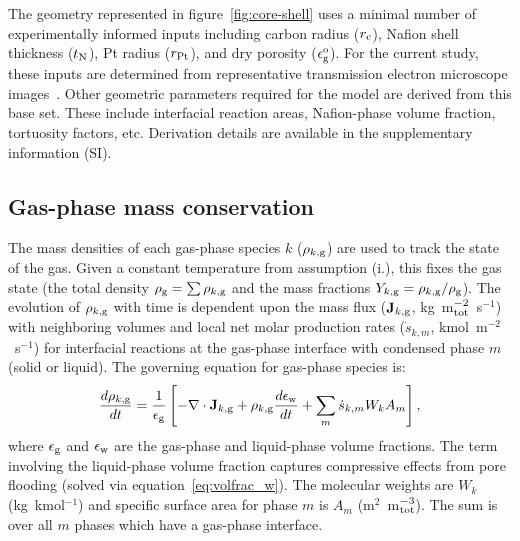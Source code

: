 \documentclass[final,3p,times,twocolumn]{elsarticle}    %
\begin{document}
The geometry represented in figure~\ref{fig:core-shell} uses a minimal number of experimentally informed inputs including carbon radius ($r_{\rm c}$), Nafion shell thickness ($t_{\rm N}$), Pt radius ($r_{\rm Pt}$), and dry porosity ($\epsilon_{\rm g}^{\rm o}$). For the current study, these inputs are determined from representative transmission electron microscope images~\cite{bib:he_2005}. Other geometric parameters required for the model are derived from this base set. These include interfacial reaction areas, Nafion-phase volume fraction, tortuosity factors, etc. Derivation details are available in the supplementary information (SI).

\subsection{Gas-phase mass conservation}
The mass densities of each gas-phase species $k$ ($\rho_{k,\rm g}$) are used to track the state of the gas. Given a constant temperature from assumption (i.), this fixes the gas state (the total density $\rho_{\rm g} = \sum \rho_{k,\rm g}$ and the mass fractions $Y_{k,\rm g} = \rho_{k,\rm g} / \rho_{\rm g}$). The evolution of $\rho_{k,\rm g}$ with time is dependent upon the mass flux (${\bf J}_{k,\rm g}$, kg~m$^{-2}_{\rm tot}$~s$^{-1}$) with neighboring volumes and local net molar production rates ($\dot{s}_{k,m}$, kmol~m$^{-2}$~s$^{-1}$) for interfacial reactions at the gas-phase interface with condensed phase $m$ (solid or liquid). The governing equation for gas-phase species is:
\begin{equation} \label{eq:mass-cons-gas}
    \frac{d \rho_{k,\rm g}}{d t} = \frac{1}{\epsilon_{\rm g}} \left[ 
    - \nabla \cdot \mathbf{J}_{k,\rm g} + \rho_{k,\rm g} \frac{d \epsilon_{\rm w}}{d t}
    + \sum_m \dot{s}_{k,m} W_k A_m \right],
\end{equation}
where $\epsilon_{\rm g}$ and $\epsilon_{\rm w}$ are the gas-phase and liquid-phase volume fractions. The term involving the liquid-phase volume fraction captures compressive effects from pore flooding (solved via equation~\ref{eq:volfrac_w}). The molecular weights are $W_k$ (kg~kmol$^{-1}$) and specific surface area for phase $m$ is $A_m$ (m$^2$~m$^{-3}_{\rm tot}$). The sum is over all $m$ phases which have a gas-phase interface.
\end{document}
